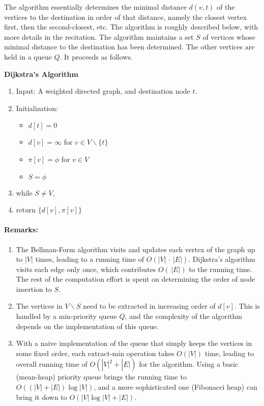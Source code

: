The algorithm essentially determines the minimal distance $d(v,t)$ of the vertices to the destination in order of that distance, namely the closest vertex first, then the second-closest, etc.  The algorithm is roughly described below, with more details in the recitation.
The algorithm maintains a set $S$ of vertices whose minimal distance to the destination has been determined. The other vertices are held in a queue $Q$. It proceeds as follows.

\begin{algorithm_}\textbf{Dijkstra's Algorithm}
\begin{enumerate}
\item{Input:} A weighted directed graph, and destination node $t$.

\item Initialization:
\begin{itemize}
  \item[] $d[t] = 0$
  \item[] $d[v] = \infty $ for $v \in V\backslash \{ t\} $
  \item[] $\pi [v] = \phi $ for $v \in V$
  \item[] $S = \phi $
\end{itemize}

\item while $S \ne V$,




\item return $\{ d[v],\pi [v]\} $
\end{enumerate}
\end{algorithm_}

\paragraph{Remarks:}
\begin{enumerate}
  \item The Bellman-Form algorithm visits and updates each vertex of the graph up to $|V|$ times, leading to a running time of $O(|V|\, \cdot \,|E|)$. Dijkstra's algorithm visits each edge only once, which contributes $O(\,|E|)$ to the running time. The rest of the computation effort is spent on determining the order of node insertion to $S$.
  \item The vertices in $V\backslash S$ need to be extracted in increasing order of $d[v]$.  This is handled by a min-priority queue $Q$, and the complexity of the algorithm depends on the implementation of this queue.
  \item With a naive implementation of the queue that simply keeps the vertices in some fixed order, each extract-min operation takes  $O(|V|)$ time, leading to overall running time of $O(|V{|^2} + |E|)$ for the algorithm. Using a basic (mean-heap) priority queue brings the running time to $O((|V| + |E|)\log |V|)$, and a more sophisticated one (Fibonacci heap) can bring it down to  $O(|V|\log |V| + |E|)$.
\end{enumerate}
